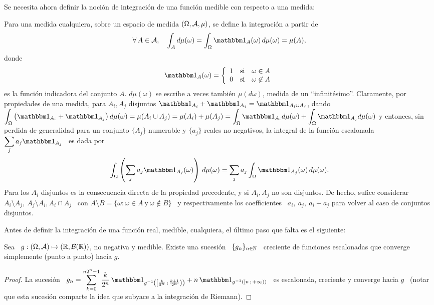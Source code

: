 Se necesita ahora definir la  noci\'on de integraci\'on de una funci\'on medible
con respecto a una medida:
%
\begin{definicion}
  Para una medida  cualquiera, sobre un espacio de  medida $(\Omega,\mathcal{A},\mu)$, se
  define la integraci\'on a partir de
  \[
  \forall \, A \in \A,  \quad \int_A d\mu(\omega) = \int_\Omega \un_A(\omega) \,
  d\mu(\omega) = \mu(A),
  \]
  donde
  \[
  \un_A(\omega) = \left\{
  \begin{array}{ccc}
  1 & \mbox{si} & \omega \in A\\
  0 & \mbox{si} & \omega \not\in A
  \end{array} \right.
  \]
  es  la funci\'on  indicadora del  conjunto $A$.   $d\mu(\omega)$ se  escribe a
  veces tambi\'en $\mu(d\omega)$,  medida de un ``infinit\'esimo''.  Claramente,
  por  propiedades  de una  medida,  para $  A_i,  A_j$  disjuntos $\un_{A_i}  +
  \un_{A_j}  =  \un_{A_i \cup  A_j}$,  dando  $\displaystyle \int_\Omega  \left(
    \un_{A_i} + \un_{A_j} \right) d\mu(\omega)  = \mu(A_i \cup A_j) = \mu(A_i) +
  \mu(A_j)  =   \int_\Omega  \un_{A_i}  d\mu(\omega)   +  \int_\Omega  \un_{A_j}
  d\mu(\omega)$ y entonces, sin perdida  de generalidad para un conjunto $\{ A_j
  \}$ numerable
  y $\{  a_j \}$ reales no negativos,  la integral de la  funci\'on escalonada \
  $\displaystyle \sum_j a_j \un_{A_j}$ \ es dada por
  \[
  \int_\Omega \left( \sum_j a_j \un_{A_j}(\omega) \right) \, d\mu(\omega) =
  \sum_j a_j \int_\Omega \un_{A_j}(\omega) \, d\mu(\omega).
  \]
  Para  los  $A_i$  disjuntos  es   la  consecuencia  directa  de  la  propiedad
  precedente, y  si $A_i,  A_j$ no son  disjuntos.  De hecho,  sufice considerar
  $A_i\setminus A_j, \:  A_j\setminus A_i, A_i \cap A_j$ \ con  $A \setminus B =
  \{ \omega: \omega \in A \: \mbox{y} \: \omega \not\in B\}$ \ y respectivamente
  los  coefficientes \  $a_i, \:  a_j, \:  a_i  + a_j$  para volver  al caso  de
  conjuntos disjuntos.
\end{definicion}


Antes de definir la integraci\'on de una funci\'on real, medible, cualquiera, el
\'ultimo paso que falta es el siguiente:
%
\begin{teorema}\label{Th:MP:MedibleLimite}
  Sea   \   $g:   (\Omega,\mathcal{A})   \mapsto  (\mathbb{R},\mathcal{B}(\mathbb{R}))$,   no   negativa   y
  medible. Existe  una sucesi\'on  \ $\{  g_n \}_{n \in  \mathbb{N}}$ \  creciente de
  funciones escalonadas que converge simplemente (punto a punto) hacia $g$.
\end{teorema}
%
\begin{proof}
  La  sucesi\'on \ $\displaystyle  g_n =  \sum_{k=0}^{n 2^n-1}  \frac{k}{2^n} \,
  \un_{g^{-1}\left(  \left[  \frac{k}{2^n}   \,  ;  \,  \frac{k+1}{2^n}  \right)
    \right)} + n \, \un_{g^{-1}\left( \left[ n \, ; \, +\infty \right) \right)}$
  \ es escalonada,  creciente y converge hacia $g$ \  (notar que esta sucesi\'on
  comparte la idea que subyace a la integraci\'on de Riemann).
\end{proof}

